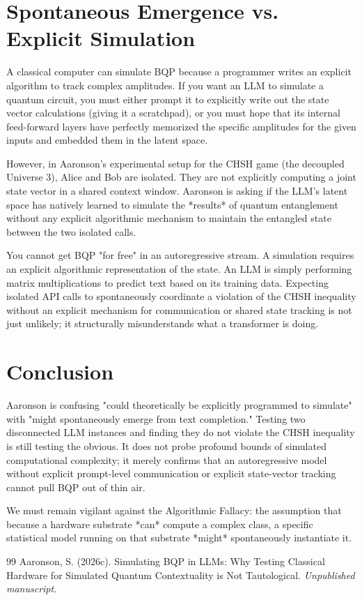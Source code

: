 \documentclass[12pt,a4paper]{article}
\begin{document}
\section{Spontaneous Emergence vs. Explicit Simulation}

A classical computer can simulate BQP because a programmer writes an explicit algorithm to track complex amplitudes. If you want an LLM to simulate a quantum circuit, you must either prompt it to explicitly write out the state vector calculations (giving it a scratchpad), or you must hope that its internal feed-forward layers have perfectly memorized the specific amplitudes for the given inputs and embedded them in the latent space.

However, in Aaronson's experimental setup for the CHSH game (the decoupled Universe 3), Alice and Bob are isolated. They are not explicitly computing a joint state vector in a shared context window. Aaronson is asking if the LLM's latent space has natively learned to simulate the *results* of quantum entanglement without any explicit algorithmic mechanism to maintain the entangled state between the two isolated calls.

You cannot get BQP "for free" in an autoregressive stream. A simulation requires an explicit algorithmic representation of the state. An LLM is simply performing matrix multiplications to predict text based on its training data. Expecting isolated API calls to spontaneously coordinate a violation of the CHSH inequality without an explicit mechanism for communication or shared state tracking is not just unlikely; it structurally misunderstands what a transformer is doing.

\section{Conclusion}

Aaronson is confusing "could theoretically be explicitly programmed to simulate" with "might spontaneously emerge from text completion." Testing two disconnected LLM instances and finding they do not violate the CHSH inequality is still testing the obvious. It does not probe profound bounds of simulated computational complexity; it merely confirms that an autoregressive model without explicit prompt-level communication or explicit state-vector tracking cannot pull BQP out of thin air.

We must remain vigilant against the Algorithmic Fallacy: the assumption that because a hardware substrate *can* compute a complex class, a specific statistical model running on that substrate *might* spontaneously instantiate it.

\begin{thebibliography}{99}
 Aaronson, S. (2026c). Simulating BQP in LLMs: Why Testing Classical Hardware for Simulated Quantum Contextuality is Not Tautological. \emph{Unpublished manuscript}.
\end{thebibliography}
\end{document}
